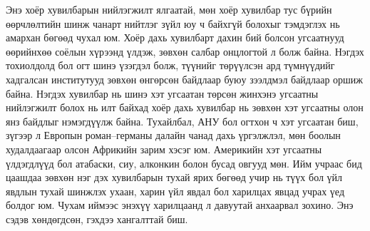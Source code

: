 Энэ хоёр хувилбарын нийлэгжилт ялгаатай, мөн хоёр хувилбар тус бүрийн өөрчлөлтийн шинж чанарт нийтлэг зүйл юу ч байхгүй болохыг тэмдэглэх нь амархан бөгөөд чухал юм. Хоёр дахь хувилбарт дахин бий болсон угсаатнууд өөрийнхөө соёлын хүрээнд үлдэж, зөвхөн салбар онцлогтой л болж байна. Нэгдэх тохиолдолд бол огт шинэ үзэгдэл болж, түүнийг төрүүлсэн ард түмнүүдийг хадгалсан институтууд зөвхөн өнгөрсөн байдлаар буюу зээлдмэл байдлаар оршиж байна. Нэгдэх хувилбар нь шинэ хэт угсаатан төрсөн жинхэнэ угсаатны нийлэгжилт болох нь илт байхад хоёр дахь хувилбар нь зөвхөн хэт угсаатны олон янз байдлыг нэмэгдүүлж байна. Тухайлбал, АНУ бол огтхон ч хэт угсаатан биш, зүгээр л Европын роман–германы далайн чанад дахь үргэлжлэл, мөн боолын худалдаагаар олсон Африкийн зарим хэсэг юм. Америкийн хэт угсаатны үлдэгдлүүд бол атабаски, сиу, алконкин болон бусад овгууд мөн. Ийм учраас бид цаашдаа зөвхөн нэг дэх хувилбарын тухай ярих бөгөөд учир нь түүх бол үйл явдлын тухай шинжлэх ухаан, харин үйл явдал бол харилцах явцад учрах үед болдог юм. Чухам иймээс энэхүү харилцаанд л давуутай анхаарвал зохино. Энэ сэдэв хөндөгдсөн, гэхдээ хангалттай биш.
